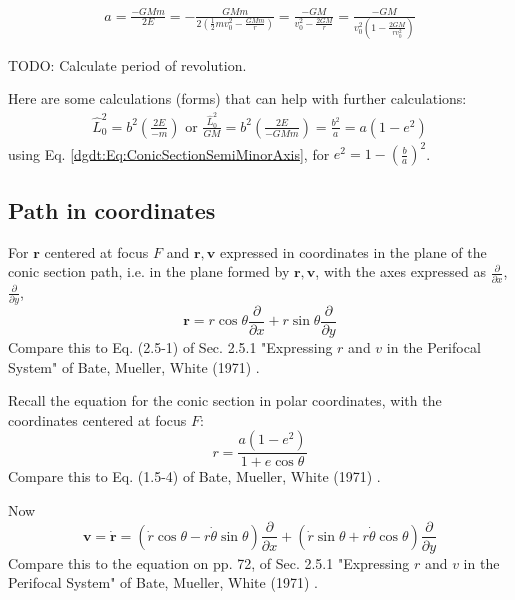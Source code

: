 \[
\begin{gathered} 
a = \frac{-GMm}{2E} = -\frac{GMm}{ 2 \left( \frac{1}{2} mv_0^2 - \frac{GMm}{r} \right) } = \frac{-GM}{v_0^2 - \frac{2GM}{r} } = \frac{-GM}{ v_0^2 \left( 1 -  \frac{2GM}{rv_0^2 } \right) }
\end{gathered} 
\]


TODO: Calculate period of revolution. 

Here are some calculations (forms) that can help with further calculations:
\begin{equation}
\begin{gathered} 
	\widehat{L}_0^2 = b^2 \left( \frac{2E}{-m} \right) \text{ or } \frac{\widehat{L}_0^2}{GM} = b^2 \left( \frac{2E}{-GMm } \right) = \frac{b^2}{a} = a(1-e^2)
\end{gathered} 
\end{equation}
using Eq. \ref{dgdt:Eq:ConicSectionSemiMinorAxis}, for $e^2 = 1 - \left( \frac{b}{a} \right)^2$. 


\subsection{Path in coordinates} 

For $\mathbf{r}$ centered at focus $F$ and $\mathbf{r}, \mathbf{v}$ expressed in coordinates in the plane of the conic section path, i.e. in the plane formed by $\mathbf{r}, \mathbf{v}$, with the axes expressed as $\frac{\partial}{\partial x}$, $\frac{ \partial }{ \partial y}$, 
\begin{equation}
\mathbf{r} = r\cos{\theta} \frac{\partial }{ \partial x} + r\sin{\theta} \frac{\partial}{\partial y}
\end{equation}
Compare this to Eq. (2.5-1) of Sec. 2.5.1 "Expressing $r$ and $v$ in the Perifocal System" of Bate, Mueller, White (1971) \cite{dgdt:BMW1971}.

Recall the equation for the conic section in polar coordinates, with the coordinates centered at focus $F$:
\begin{equation}
r = \frac{a(1-e^2) }{ 1 + e\cos{\theta}}
\end{equation}
Compare this to Eq. (1.5-4) of Bate, Mueller, White (1971) \cite{dgdt:BMW1971}.

Now
\begin{equation}
\mathbf{v} = \dot{\mathbf{r}} = (\dot{r} \cos{\theta} - r\dot{\theta} \sin{\theta}) \frac{\partial}{\partial x} + (\dot{r}\sin{\theta} + r\dot{\theta}\cos{\theta}) \frac{\partial }{ \partial y}
\end{equation}
Compare this to the equation on pp. 72, of Sec. 2.5.1 "Expressing $r$ and $v$ in the Perifocal System" of Bate, Mueller, White (1971) \cite{dgdt:BMW1971}.

